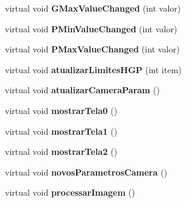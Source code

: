 \begin{DoxyCompactItemize}
\item 
virtual void {\bfseries G\+Max\+Value\+Changed} (int valor)\hypertarget{classcalibrador_a553cff0ef348ed22bdf9358cc1ed0b80}{}\label{classcalibrador_a553cff0ef348ed22bdf9358cc1ed0b80}

\item 
virtual void {\bfseries P\+Min\+Value\+Changed} (int valor)\hypertarget{classcalibrador_a46cd6ee81ff4568a606e06b42bc1c136}{}\label{classcalibrador_a46cd6ee81ff4568a606e06b42bc1c136}

\item 
virtual void {\bfseries P\+Max\+Value\+Changed} (int valor)\hypertarget{classcalibrador_ad97a3f209d80ebcddebc0f39159db2ab}{}\label{classcalibrador_ad97a3f209d80ebcddebc0f39159db2ab}

\item 
virtual void {\bfseries atualizar\+Limites\+H\+GP} (int item)\hypertarget{classcalibrador_aab9df4371d1bbff71ee355509021467b}{}\label{classcalibrador_aab9df4371d1bbff71ee355509021467b}

\item 
virtual void {\bfseries atualizar\+Camera\+Param} ()\hypertarget{classcalibrador_ae94db85c7b116581a9a71e63689f1c65}{}\label{classcalibrador_ae94db85c7b116581a9a71e63689f1c65}

\item 
virtual void {\bfseries mostrar\+Tela0} ()\hypertarget{classcalibrador_abb5424be8a92b8b9b9eb4be637baac4c}{}\label{classcalibrador_abb5424be8a92b8b9b9eb4be637baac4c}

\item 
virtual void {\bfseries mostrar\+Tela1} ()\hypertarget{classcalibrador_af19f7ed13b5b6e5fb9d5067204d29746}{}\label{classcalibrador_af19f7ed13b5b6e5fb9d5067204d29746}

\item 
virtual void {\bfseries mostrar\+Tela2} ()\hypertarget{classcalibrador_a8859babb78b246e6f46120ea84cbb46a}{}\label{classcalibrador_a8859babb78b246e6f46120ea84cbb46a}

\item 
virtual void {\bfseries novos\+Parametros\+Camera} ()\hypertarget{classcalibrador_a0c6dffaac81521d71e93f6442d338a6a}{}\label{classcalibrador_a0c6dffaac81521d71e93f6442d338a6a}

\item 
virtual void {\bfseries processar\+Imagem} ()\hypertarget{classcalibrador_a8fdb3e1b317d58e76079f7575ee13403}{}\label{classcalibrador_a8fdb3e1b317d58e76079f7575ee13403}


\end{DoxyCompactItemize}
